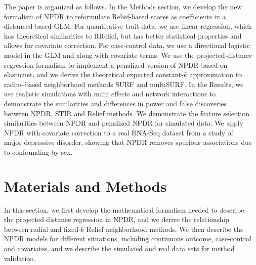 \documentclass[10pt]{article}
\begin{document}

The paper is organized as follows. In the Methods section, we develop the new formalism of NPDR to reformulate Relief-based scores as coefficients in a distanced-based GLM. For quantitative trait data, we use linear regression, which has theoretical similarities to RRelief, but has better statistical properties and allows for covariate correction. For case-control data, we use a directional logistic model in the GLM and along with covariate terms. We use the projected-distance regression formalism to implement a penalized version of NPDR based on elasticnet, and we derive the theoretical expected constant-$k$ approximation to radius-based neighborhood methods SURF and multiSURF.  In the Results, we use realistic simulations with main effects and network interactions to demonstrate the similarities and differences in power and false discoveries between NPDR, STIR and Relief methods. We demonstrate the feature selection similarities between NPDR and penalized NPDR for simulated data. We apply NPDR with covariate correction to a real RNA-Seq dataset from a study of major depressive disorder, showing that NPDR removes spurious associations due to confounding by sex. 




\section{Materials and Methods}
In this section, we first develop the mathematical formalism needed to describe the projected distance regression in NPDR, and we derive the relationship between radial and fixed-$k$ Relief neighborhood methods. We then describe the NPDR models for different situations, including continuous outcome, case-control and covariates, and we describe the simulated and real data sets for method validation. 

\def\ri{R_i}
\def\rj{R_j}
\def\kmi{k_{M_i}}
\def\khi{k_{H_i}}
\def\hji{H_{j_i}}
\def\ma{\overline{M}_a}
\def\ha{\overline{H}_a}
\def\mnu{M_\nu}
\def\hnu{H_\nu}
\def\myd{\text{diff}}
\def\ka{\bar{k}_\alpha}
\end{document}
